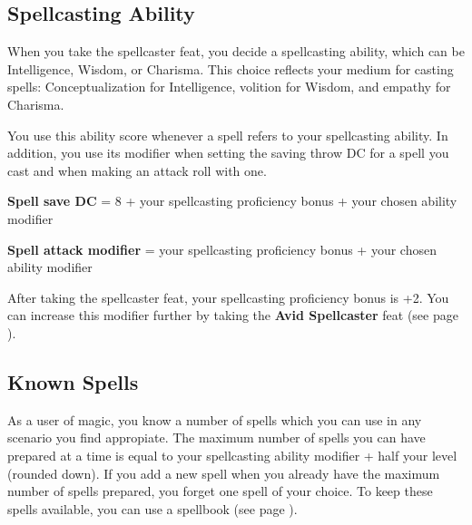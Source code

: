 


\subsection*{Spellcasting Ability}
    When you take the spellcaster feat, you decide a spellcasting ability, which can be Intelligence, Wisdom, or Charisma.
    This choice reflects your medium for casting spells: Conceptualization for Intelligence, volition for Wisdom, and empathy for Charisma.

    You use this ability score whenever a spell refers to your spellcasting ability.
    In addition, you use its modifier when setting the saving throw DC for a spell you cast and when making an attack roll with one.

    \textbf{Spell save DC} = 8 + your spellcasting proficiency bonus + your chosen ability modifier

    \textbf{Spell attack modifier} = your spellcasting proficiency bonus + your chosen ability modifier

    After taking the spellcaster feat, your spellcasting proficiency bonus is +2.
    You can increase this modifier further by taking the \textbf{Avid Spellcaster} feat (see page \pageref{feat::avidspellcaster}).

\subsection*{Known Spells}
    As a user of magic, you know a number of spells which you can use in any scenario you find appropiate.
    The maximum number of spells you can have prepared at a time is equal to your spellcasting ability modifier + half your level (rounded down).
    If you add a new spell when you already have the maximum number of spells prepared, you forget one spell of your choice.
    To keep these spells available, you can use a spellbook (see page \pageref{item::spellbook}).

